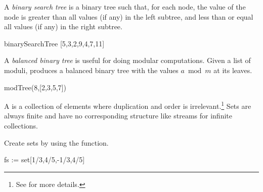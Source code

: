 {{{{{{{{\begin{xtc}
\begin{xtccomment}
A {\it binary search tree} is a binary tree such that,
for each node, the value of the node is
greater than all values (if any) in the left subtree,
and less than or equal all values (if any) in the right subtree.
\end{xtccomment}
\begin{spadsrc}
binarySearchTree [5,3,2,9,4,7,11]
\end{spadsrc}
\begin{TeXOutput}
\begin{fricasmath}{15}
%
\end{fricasmath}
\end{TeXOutput}
\end{xtc}

\begin{xtc}
\begin{xtccomment}
A {\it balanced binary tree} is useful for doing modular computations.
Given a list  of moduli,
 produces a balanced binary
tree with the values $a \bmod m$
at its leaves.
\end{xtccomment}
\begin{spadsrc}
modTree(8,[2,3,5,7])
\end{spadsrc}
\begin{TeXOutput}
\begin{fricasmath}{16}
%
\end{fricasmath}
\end{TeXOutput}
\end{xtc}

A  is a collection of elements where duplication
and order is irrelevant.\footnote{See  for more
details.}
Sets are always finite and have no corresponding
structure like streams for infinite collections.

\begin{xtc}
\begin{xtccomment}
Create sets by using the  function.
\end{xtccomment}
\begin{spadsrc}
fs := set[1/3,4/5,-1/3,4/5] 
\end{spadsrc}
\begin{TeXOutput}
\begin{fricasmath}{17}
%
\end{fricasmath}
\end{TeXOutput}
\end{xtc}

}}}}}}}}
